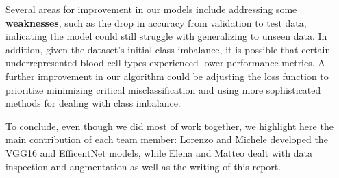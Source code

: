 \documentclass[11pt]{article}
\begin{document}
\begin{multicols*}{2}
        Several areas for improvement in our models include addressing some \textbf{weaknesses}, such as the drop in accuracy from validation to test data, indicating the model could still struggle with generalizing to unseen data. In addition, given the dataset's initial class imbalance, it is possible that certain underrepresented blood cell types experienced lower performance metrics. A further improvement in our algorithm could be adjusting the loss function to prioritize minimizing critical misclassification and using more sophisticated methods for dealing with class imbalance.

        To conclude, even though we did most of work together, we highlight here the main contribution of each team member: Lorenzo and Michele developed the VGG16 and EfficentNet models, while Elena and Matteo dealt with data inspection and augmentation as well as the writing of this report.

        
        
        
    
    \end{multicols*}
\end{document}

